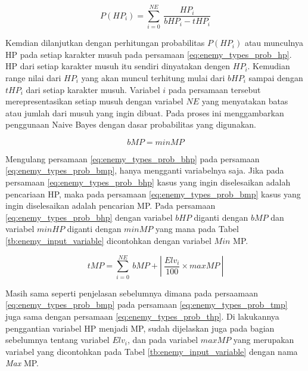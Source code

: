 \begin{equation}\label{eq:enemy_types_prob_hp}
P(HP_{i}) = \sum_{i=0}^{NE}\ \frac{HP_{i}}{bHP_{i} - tHP_{i}}
\end{equation}

Kemdian dilanjutkan dengan perhitungan probabilitas $P(HP_{i})$ atau munculnya HP pada setiap karakter musuh pada persamaan \ref{eq:enemy_types_prob_hp}. HP dari setiap karakter musuh itu sendiri dinyatakan dengen $HP_{i}$. Kemudian range nilai dari $HP_{i}$ yang akan muncul terhitung mulai dari $bHP_{i}$ sampai dengan $tHP_{i}$ dari setiap karakter musuh. Variabel $i$ pada persamaan tersebut merepresentasikan setiap musuh dengan variabel $NE$ yang menyatakan batas atau jumlah dari musuh yang ingin dibuat. Pada proses ini menggambarkan penggunaan Naive Bayes dengan dasar probabilitas yang digunakan.
\vspace{1ex}

\begin{equation}\label{eq:enemy_types_prob_bmp}
bMP = minMP
\end{equation}

Mengulang persamaan \ref{eq:enemy_types_prob_bhp} pada persamaan \ref{eq:enemy_types_prob_bmp}, hanya mengganti variabelnya saja. Jika pada persamaan \ref{eq:enemy_types_prob_bhp} kasus yang ingin diselesaikan adalah pencariaan HP, maka pada persamaan \ref{eq:enemy_types_prob_bmp} kasus yang ingin diselesaikan adalah pencarian MP. Pada persamaan \ref{eq:enemy_types_prob_bhp} dengan variabel $bHP$ diganti dengan $bMP$ dan variabel $minHP$ diganti dengan $minMP$ yang mana pada Tabel \ref{tb:enemy_input_variable} dicontohkan dengan variabel $Min$ MP.
\vspace{1ex}

\begin{equation}\label{eq:enemy_types_prob_tmp}
tMP = \sum_{i=0}^{NE}\ bMP + \left |\ \frac{Elv_{i}}{100} \times maxMP\ \right |
\end{equation}

Masih sama seperti penjelasan sebelumnya dimana pada persaamaan \ref{eq:enemy_types_prob_bmp} pada persamaan \ref{eq:enemy_types_prob_tmp} juga sama dengan persamaan \ref{eq:enemy_types_prob_thp}. Di lakukannya penggantian variabel HP menjadi MP, sudah dijelaskan juga pada bagian sebelumnya tentang variabel $Elv_{i}$, dan pada variabel $maxMP$ yang merupakan variabel yang dicontohkan pada Tabel \ref{tb:enemy_input_variable} dengan nama \textit{Max} MP.
\vspace{1ex}

